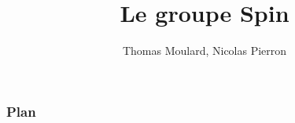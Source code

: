 \documentclass[mathserif]{beamer}
\title{Le groupe Spin}
\author{Thomas Moulard, Nicolas Pierron}
\begin{document}
\frame{
  \titlepage
}

\begin{frame}
  \frametitle{Plan}

  \tableofcontents
\end{frame}






\end{document}
